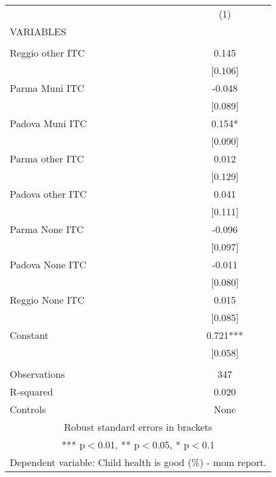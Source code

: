 \begin{tabular}{lc} \hline
 & (1) \\
VARIABLES &  \\ \hline
 &  \\
Reggio other ITC & 0.145 \\
 & [0.106] \\
Parma Muni ITC & -0.048 \\
 & [0.089] \\
Padova Muni ITC & 0.154* \\
 & [0.090] \\
Parma other ITC & 0.012 \\
 & [0.129] \\
Padova other ITC & 0.041 \\
 & [0.111] \\
Parma None ITC & -0.096 \\
 & [0.097] \\
Padova None ITC & -0.011 \\
 & [0.080] \\
Reggio None ITC & 0.015 \\
 & [0.085] \\
Constant & 0.721*** \\
 & [0.058] \\
 &  \\
Observations & 347 \\
R-squared & 0.020 \\
 Controls & None \\ \hline
\multicolumn{2}{c}{ Robust standard errors in brackets} \\
\multicolumn{2}{c}{ *** p$<$0.01, ** p$<$0.05, * p$<$0.1} \\
\multicolumn{2}{c}{ Dependent variable: Child health is good (\%) - mom report.} \\
\end{tabular}
